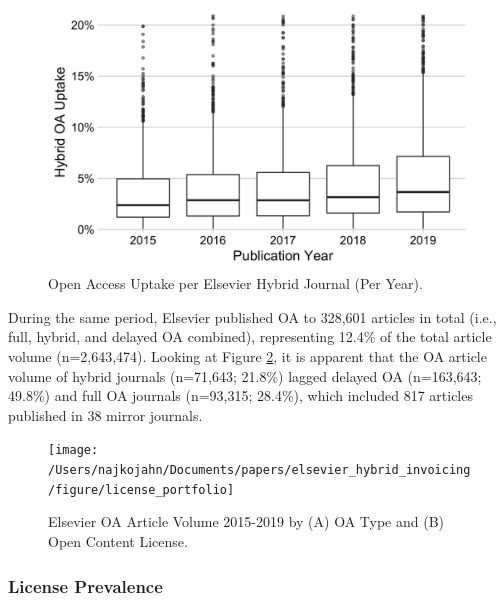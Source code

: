 \documentclass[a4paper,man,floatsintext,longtable,noextraspace,12pt]{apa6}
\begin{document}
\begin{figure}[H]

{\centering \includegraphics[width=0.7\linewidth,]{manuscript_files/figure-latex/boxuptake-1} 

}

\caption{Open Access Uptake per Elsevier Hybrid Journal (Per Year).}\label{fig:boxuptake}
\end{figure}

During the same period, Elsevier published OA to 328,601 articles in
total (i.e., full, hybrid, and delayed OA combined), representing 12.4\%
of the total article volume (n=2,643,474). Looking at Figure
\ref{fig:oa_volume_fig}, it is apparent that the OA article volume of
hybrid journals (n=71,643; 21.8\%) lagged delayed OA (n=163,643; 49.8\%)
and full OA journals (n=93,315; 28.4\%), which included 817 articles
published in 38 mirror journals.

\begin{figure}[H]

{\centering \texttt{[image: /Users/najkojahn/Documents/papers/elsevier\_hybrid\_invoicing/figure/license\_portfolio]} 

}

\caption{Elsevier OA Article Volume 2015-2019 by (A) OA Type and (B) Open Content License.}\label{fig:oa_volume_fig}
\end{figure}

\hypertarget{license-prevalence}{%
\subsubsection*{License Prevalence}\label{license-prevalence}}
\end{document}
